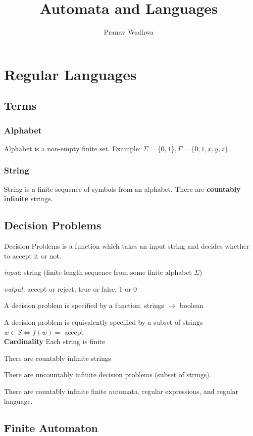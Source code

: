 \documentclass[oneside, 12pt]{book}
\title{
  Automata and Languages
}
\author{Pranav Wadhwa}
\begin{document}
\maketitle
\tableofcontents
\chapter{Regular Languages}

\section{Terms}

\subsection{Alphabet}
Alphabet is a non-empty finite set. Example: $\Sigma = \{0,1\}, \Gamma=\{0,1,x,y,z\}$

\subsection{String}
String is a finite sequence of symbols from an alphabet. There are \textbf{countably infinite} strings.

\section{Decision Problems}

Decision Problems is a function which takes an input string and decides whether to accept it or not.

\emph{input}: string (finite length sequence from some finite alphabet $\Sigma$)

\emph{output}: accept or reject, true or false, 1 or 0

A decision problem is specified by a function: strings $\to$ boolean

A decision problem is equivalently specified by a subset of strings
$w\in S \iff f(w) = $ accept\\

\textbf{Cardinality}
Each string is finite

There are countably infinite strings

There are uncountably infinite decision problems (subset of strings).

There are countably infinite finite automata, regular expressions, and regular language.


\section{Finite Automaton}
\end{document}
